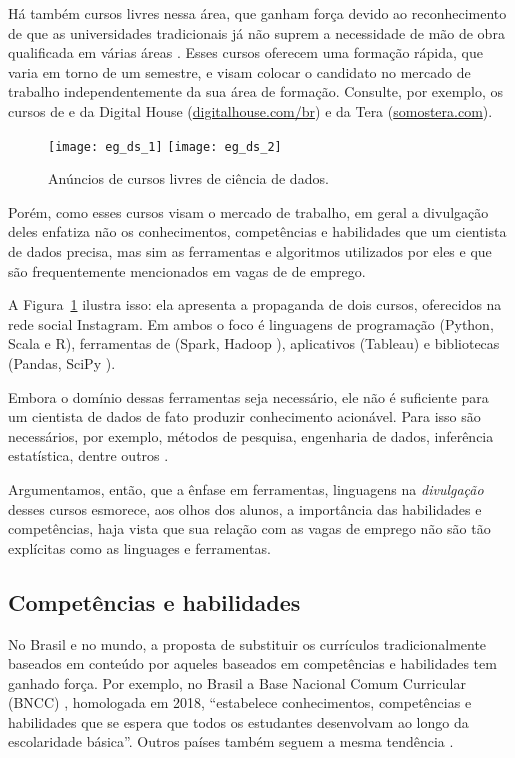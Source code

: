 Há também cursos livres nessa área, que ganham força devido ao reconhecimento de que as universidades tradicionais já não suprem a necessidade de mão de obra qualificada em várias áreas \cite{Zulauf2006}.
Esses cursos oferecem uma formação rápida, que varia em torno de um semestre, e visam colocar o candidato no mercado de trabalho independentemente da sua área de formação.
Consulte, por exemplo, os cursos de  e  da Digital House (\url{digitalhouse.com/br}) e da Tera (\url{somostera.com}).

\begin{figure}
	\centering

	\texttt{[image: eg\_ds\_1]}\hfill
	\texttt{[image: eg\_ds\_2]}

	\caption{Anúncios de cursos livres de ciência de dados.}
	\label{fig:cursos}
\end{figure}

Porém, como esses cursos visam o mercado de trabalho, em geral a divulgação deles enfatiza não os conhecimentos, competências e habilidades que um cientista de dados precisa, mas sim as ferramentas e algoritmos utilizados por eles e que são frequentemente mencionados em vagas de de emprego.

A Figura~\ref{fig:cursos} ilustra isso: ela apresenta a propaganda de dois cursos, oferecidos na rede social Instagram.
Em ambos o foco é linguagens de programação (Python, Scala e R), ferramentas de  (Spark, Hadoop \etc), aplicativos (Tableau) e bibliotecas (Pandas, SciPy \etc).

Embora o domínio dessas ferramentas seja necessário, ele não é suficiente para um cientista de dados de fato produzir conhecimento acionável.
Para isso são necessários, por exemplo, métodos de pesquisa, engenharia de dados, inferência estatística, dentre outros \cite[p.~15]{CF-DS-Release2019}.

Argumentamos, então, que a ênfase em ferramentas, linguagens \etc na \emph{divulgação} desses cursos esmorece, aos olhos dos alunos, a importância das habilidades e competências, haja vista que sua relação com as vagas de emprego não são tão explícitas como as linguages e ferramentas.

\subsection{Competências e habilidades}\label{sec:hc}

No Brasil e no mundo, a proposta de substituir os currículos tradicionalmente baseados em conteúdo por aqueles baseados em competências e habilidades tem ganhado força.
Por exemplo, no Brasil a Base Nacional Comum Curricular (BNCC) \cite{BNCC}, homologada em 2018, ``estabelece conhecimentos, competências e habilidades que se espera que todos os estudantes desenvolvam ao longo da escolaridade básica''.
Outros países também seguem a mesma tendência \cite{Inkson2017}.

